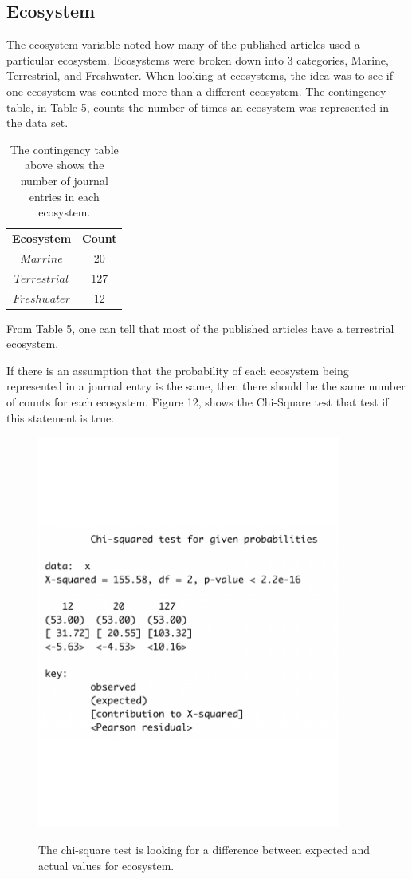 \documentclass[12pt, letterpaper]{article}
\begin{document}
\subsection{Ecosystem}
The ecosystem variable noted how many of the published articles used a particular ecosystem. Ecosystems were broken down into 3 categories, Marine, Terrestrial, and Freshwater. When looking at ecosystems, the idea was to see if one ecosystem was counted more than a different ecosystem. The contingency table, in Table 5, counts the number of times an ecosystem was represented in the data set. 
\begin{table}[!h]
\begin{center}
\begin{tabular}{|c|c|}
\textbf{Ecosystem} & \textbf{Count}\\
$Marrine$ & 20\\
$Terrestrial$ &  127\\
$Freshwater$ &  12\\
\end{tabular}
\end{center}
\label{fig: Ecosystem Contingency Table}
\caption{The contingency table above shows the number of journal entries in each ecosystem.}
\end{table}
From Table 5, one can tell that most of the published articles have a terrestrial ecosystem. 

If there is an assumption that the probability of each ecosystem being represented in a journal entry is the same, then there should be the same number of counts for each ecosystem. Figure 12, shows the Chi-Square test that test if this statement is true. 
\begin{figure}[h]
\begin{center}
	\includegraphics[width=10cm]{chi-eco-1.pdf}
	\label{fig: Chi-Square Test: Ecosystem}
	\caption{The chi-square test is looking for a difference between expected and actual values for ecosystem.}
\end{center}
\end{figure}
\end{document}
